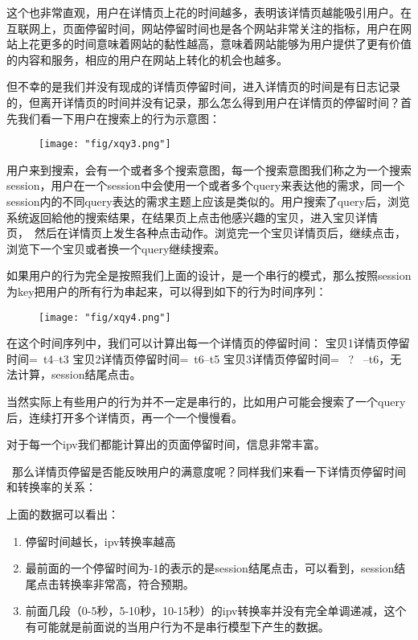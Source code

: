 \par 这个也非常直观，用户在详情页上花的时间越多，表明该详情页越能吸引用户。在互联网上，页面停留时间，网站停留时间也是各个网站非常关注的指标，用户在网站上花更多的时间意味着网站的黏性越高，意味着网站能够为用户提供了更有价值的内容和服务，相应的用户在网站上转化的机会也越多。
\par 但不幸的是我们并没有现成的详情页停留时间，进入详情页的时间是有日志记录的，但离开详情页的时间并没有记录，那么怎么得到用户在详情页的停留时间？首先我们看一下用户在搜索上的行为示意图：
​\begin{figure}[!h]
	\centering
	\texttt{[image: "fig/xqy3.png"]}
	\caption{}
	\label{fig:xqy3}
\end{figure}
​用户来到搜索，会有一个或者多个搜索意图，每一个搜索意图我们称之为一个搜索session，用户在一个session中会使用一个或者多个query来表达他的需求，同一个session内的不同query表达的需求主题上应该是类似的。用户搜索了query后，浏览系统返回給他的搜索结果，在结果页上点击他感兴趣的宝贝，进入宝贝详情页， 然后在详情页上发生各种点击动作。浏览完一个宝贝详情页后，继续点击，浏览下一个宝贝或者换一个query继续搜索。
\par 如果用户的行为完全是按照我们上面的设计，是一个串行的模式，那么按照session为key把用户的所有行为串起来，可以得到如下的行为时间序列：
​\begin{figure}[!h]
	\centering
	\texttt{[image: "fig/xqy4.png"]}
	\caption{}
	\label{fig:xqy4}
\end{figure}
​在这个时间序列中，我们可以计算出每一个详情页的停留时间：
\newline 宝贝1详情页停留时间= t4–t3
\newline 宝贝2详情页停留时间= t6–t5
\newline 宝贝3详情页停留时间=  ?  –t6，无法计算，session结尾点击。

​当然实际上有些用户的行为并不一定是串行的，比如用户可能会搜索了一个query后，连续打开多个详情页，再一个一个慢慢看。
​\par 对于每一个ipv我们都能计算出的页面停留时间，信息非常丰富。
\par 那么详情页停留是否能反映用户的满意度呢？同样我们来看一下详情页停留时间和转换率的关系：
​
​\par 上面的数据可以看出：
\begin{enumerate}
\item 停留时间越长，ipv转换率越高
\item 最前面的一个停留时间为-1的表示的是session结尾点击，可以看到，session结尾点击转换率非常高，符合预期。
\item 前面几段（0-5秒，5-10秒，10-15秒）的ipv转换率并没有完全单调递减，这个有可能就是前面说的当用户行为不是串行模型下产生的数据。
\end{enumerate}

